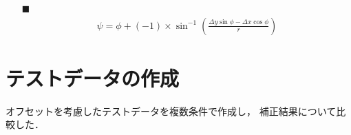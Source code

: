 \documentclass[twocolumn,a4j]{jsarticle}
\begin{document}
\begin{itemize}
    \item [$\blacksquare$] 
          \begin{eqnarray*}
            \psi = \phi + \left(-1\right) × \sin^{-1}\left(\frac{\Delta y \sin \phi - \Delta x \cos \phi}{r}\right)
          \end{eqnarray*}
\end{itemize}

\newpage







\section{テストデータの作成}
オフセットを考慮したテストデータを複数条件で作成し，
補正結果について比較した．
\end{document}
